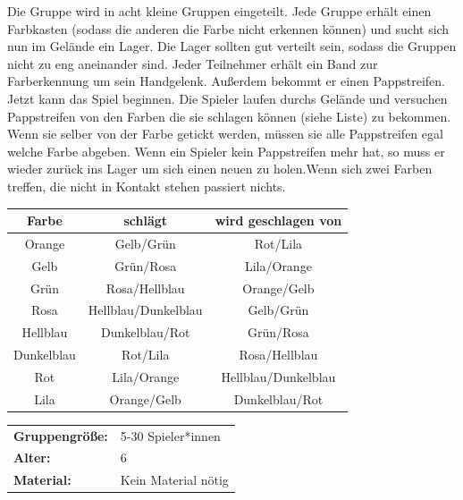 Die Gruppe wird in acht kleine Gruppen eingeteilt. Jede Gruppe erhält einen Farbkasten (sodass die anderen die Farbe nicht erkennen können) und sucht sich nun im Gelände ein Lager. Die Lager sollten gut verteilt sein, sodass die Gruppen nicht zu eng aneinander sind. Jeder Teilnehmer erhält ein Band zur Farberkennung um sein Handgelenk. Außerdem bekommt er einen Pappstreifen. Jetzt kann das Spiel beginnen. Die Spieler laufen durchs Gelände und versuchen Pappstreifen von den Farben die sie schlagen können (siehe Liste)  zu bekommen. Wenn sie selber von der Farbe getickt werden, müssen sie 
alle Pappstreifen egal welche Farbe abgeben. Wenn ein Spieler kein Pappstreifen mehr hat, so muss er wieder zurück ins Lager um sich einen neuen zu holen.Wenn sich zwei Farben treffen, die nicht in Kontakt stehen passiert nichts. \\
\begin{table}[H]
    \centering
    \begin{tabular}{|c|c|c|}
    \hline
      \textbf{Farbe}  & \textbf{schlägt}  & \textbf{wird geschlagen von} \\ \hline
        Orange  & Gelb/Grün & Rot/Lila \\ \hline
        Gelb & Grün/Rosa & Lila/Orange \\ \hline
        Grün & Rosa/Hellblau & Orange/Gelb \\ \hline
        Rosa & Hellblau/Dunkelblau & Gelb/Grün \\ \hline
        Hellblau & Dunkelblau/Rot & Grün/Rosa \\ \hline
        Dunkelblau & Rot/Lila & Rosa/Hellblau \\ \hline
        Rot  & Lila/Orange & Hellblau/Dunkelblau \\ \hline
        Lila  &  Orange/Gelb & Dunkelblau/Rot  \\ \hline
    \end{tabular}
\end{table}


\newpage
\begin{table}[H]
\begin{tabular}{>{\bfseries}lp{8cm}}
   Gruppengröße:   & 5-30 Spieler*innen\\
    Alter: & 6 \\
    Material: & Kein Material nötig \\ 
\end{tabular}
\end{table}


